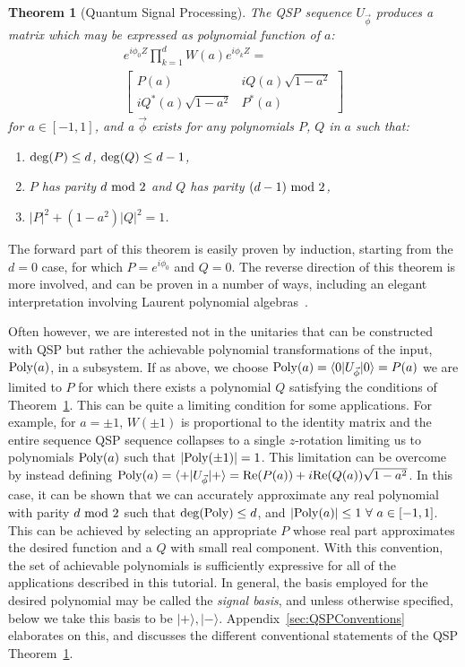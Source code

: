 \documentclass[aps,pra,showpacs,notitlepage,twocolumn,superscriptaddress,nofootinbib]{revtex4-1}
\newtheorem{theorem}{Theorem}
\def\>{\rangle}
\newcommand{\mattwocb}[4]{\left[
	\begin{array}{cc}{#1}&{#2}\\{#3}&{#4}\end{array}\right]}
\begin{document}
    \begin{theorem}[Quantum Signal Processing]
    The QSP sequence $U_{\vec{\phi}}$ produces a matrix which may be expressed as polynomial function of $a$:
    \begin{equation}\label{eq:qsp_thm}
        \begin{gathered}
            e^{i \phi_0 Z} \prod_{k=1}^d  W(a)  e^{i\phi_k Z} = \\
            \mattwocb{P(a)}{iQ(a)\sqrt{1-a^2}}{iQ^*(a)\sqrt{1-a^2}}{P^*(a)}
        \end{gathered}
    \end{equation}
    for $a\in[-1, 1]$, and a $\vec{\phi}$ exists for any polynomials $P$, $Q$ in $a$ such that:
    \begin{enumerate}[label=(\roman*)]
      \item ${\rm deg}(P) \leq d$, ${\rm deg}(Q) \leq d-1$,
      \item $P$ has parity $d~ {\rm mod}~ 2$ and $Q$ has parity $(d-1)~ {\rm mod}~ 2$,
      \item $|P|^2 + (1-a^2) |Q|^2 = 1$.
    \end{enumerate}
    \label{thm:qsp}
    \end{theorem}
The forward part of this theorem is easily proven by induction, starting from the $d=0$ case, for which $P=e^{i\phi_0}$ and $Q=0$. 
The reverse direction of this theorem is more involved, and can be proven in a number of ways, including an elegant interpretation involving Laurent polynomial algebras~\cite{Haah_2019, chao2020finding}. 

Often however, we are interested not in the unitaries that can be constructed with QSP but rather the achievable polynomial transformations of the input, ${\rm Poly}(a)$, in a subsystem.
If as above, we choose ${\rm Poly}(a) = \braket{0 | U_{\vec\phi} | 0} = P(a)$ we are limited to $P$ for which there exists a polynomial $Q$ satisfying the conditions of Theorem~\ref{thm:qsp}.
This can be quite a limiting condition for some applications.
For example, for $a = \pm 1$, $W(\pm 1)$ is proportional to the identity matrix and the entire sequence QSP sequence collapses to a single $z$-rotation limiting us to polynomials ${\rm Poly}(a)$ such that $|{\rm Poly}(\pm 1)| = 1$.
This limitation can be overcome by instead defining ${\rm Poly}(a) = \braket{+ | U_{\vec\phi} | +} = \text{Re}(P(a)) + i\text{Re}(Q(a))\sqrt{1-a^2}$.
In this case, it can be shown that we can accurately approximate any real polynomial with parity $d~ {\rm mod}~ 2$ such that $\deg({\rm Poly}) \le d$, and $|{\rm Poly}(a)| \le 1 ~ \forall ~a \in [-1, 1]$. 
This can be achieved by selecting an appropriate $P$ whose real part approximates the desired function and a $Q$ with small real component.
With this convention, the set of achievable polynomials is sufficiently expressive for all of the applications described in this tutorial.  In general, the basis employed for the desired polynomial may be called the {\em signal basis}, and unless otherwise specified, below we take this basis to be $|+\>, |-\>$.
Appendix~\ref{sec:QSPConventions} elaborates on this, and discusses the different conventional statements of the QSP Theorem~\ref{thm:qsp}.
\end{document}
